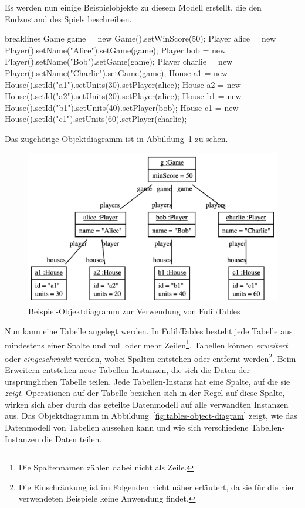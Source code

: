 Es werden nun einige Beispielobjekte zu diesem Modell erstellt, die den Endzustand des Spiels beschreiben.

\begin{jcodeblock*}{breaklines}
    Game game = new Game().setWinScore(50);
    Player alice = new Player().setName("Alice").setGame(game);
    Player bob = new Player().setName("Bob").setGame(game);
    Player charlie = new Player().setName("Charlie").setGame(game);
    House a1 = new House().setId("a1").setUnits(30).setPlayer(alice);
    House a2 = new House().setId("a2").setUnits(20).setPlayer(alice);
    House b1 = new House().setId("b1").setUnits(40).setPlayer(bob);
    House c1 = new House().setId("c1").setUnits(60).setPlayer(charlie);
\end{jcodeblock*}

Das zugehörige Objektdiagramm ist in Abbildung~\ref{fig:game-object-diagram} zu sehen.

\begin{figure}
    \includegraphics[width=\textwidth]{chapter/pattern-matching/img/game-object-diagram.png}
    \caption{Beispiel-Objektdiagramm zur Verwendung von FulibTables}
    \label{fig:game-object-diagram}
\end{figure}

Nun kann eine Tabelle angelegt werden.
In FulibTables besteht jede Tabelle aus mindestens einer Spalte und null oder mehr Zeilen\footnote{Die Spaltennamen zählen dabei nicht als Zeile.}.
Tabellen können \emph{erweitert} oder \emph{eingeschränkt} werden, wobei Spalten entstehen oder entfernt werden\footnote{Die Einschränkung ist im Folgenden nicht näher erläutert, da sie für die hier verwendeten Beispiele keine Anwendung findet.}.
Beim Erweitern entstehen neue Tabellen-Instanzen, die sich die Daten der ursprünglichen Tabelle teilen.
Jede Tabellen-Instanz hat eine Spalte, auf die sie \emph{zeigt}.
Operationen auf der Tabelle beziehen sich in der Regel auf diese Spalte, wirken sich aber durch das geteilte Datenmodell auf alle verwandten Instanzen aus.
Das Objektdiagramm in Abbildung~\ref{fig:tables-object-diagram} zeigt, wie das Datenmodell von Tabellen aussehen kann und wie sich verschiedene Tabellen-Instanzen die Daten teilen.


